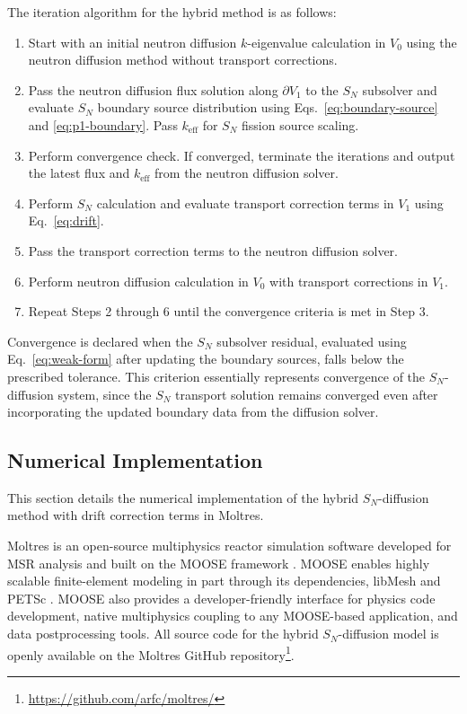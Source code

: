 The iteration algorithm for the hybrid method is as follows:
%
\begin{enumerate}
  \item Start with an initial neutron diffusion $k$-eigenvalue calculation in $V_0$ using the
    neutron diffusion method without transport corrections.
  \item Pass the neutron diffusion flux solution along $\partial V_1$ to the
    $S_N$ subsolver and evaluate $S_N$ boundary source distribution using Eqs.\
    \ref{eq:boundary-source} and \ref{eq:p1-boundary}. Pass $k_\text{eff}$ for $S_N$ fission
    source scaling.
  \item Perform convergence check. If converged, terminate the iterations and output the latest
    flux and $k_\text{eff}$ from the neutron diffusion solver.
  \item Perform $S_N$ calculation and evaluate transport correction terms
    in $V_1$ using Eq.\ \ref{eq:drift}.
  \item Pass the transport correction terms to the neutron diffusion solver.
  \item Perform neutron diffusion calculation in $V_0$ with transport corrections in $V_1$.
  \item Repeat Steps 2 through 6 until the convergence criteria is met in Step 3.
\end{enumerate}
%
Convergence is declared when the $S_N$ subsolver residual, evaluated using Eq.\ \ref{eq:weak-form}
after updating the boundary sources, falls below the prescribed tolerance. This
criterion essentially represents convergence of the $S_N$-diffusion system, since the $S_N$
transport solution remains converged even after incorporating the updated boundary data from the
diffusion solver.

\subsection{Numerical Implementation} \label{sec:numerical-implementation}

This section details the numerical implementation of the hybrid $S_N$-diffusion method with
drift correction terms in Moltres.

Moltres \cite{lindsay_introduction_2018} is an open-source multiphysics reactor simulation software
developed for \gls{MSR} analysis and built on the \gls{MOOSE} framework
\cite{giudicelli30MOOSEEnabling2024}. \gls{MOOSE} enables highly scalable finite-element modeling
in part through its dependencies, libMesh \cite{kirkLibMeshLibraryParallel2006a} and PETSc
\cite{satishPETScUsersManual2019}.
\gls{MOOSE} also provides a developer-friendly interface for physics code development, native
multiphysics coupling to any \gls{MOOSE}-based application, and data postprocessing tools.
All source code for the hybrid $S_N$-diffusion model is openly available on the Moltres
GitHub repository\footnote{\url{https://github.com/arfc/moltres/}}.

